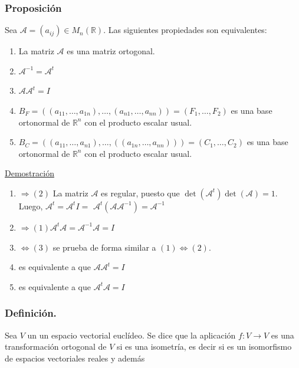 \documentclass[12pt, a4paper, ones, notitlepage, openany,titlepage]{article}
\begin{document}
\subsubsection{Proposición}
Sea $\mathcal{A}=\left(a_{i j}\right) \in M_{n}(\mathbb{R})$. Las siguientes propiedades son equivalentes:
\begin{enumerate}[label=(\arabic*)]
	\item La matriz $\mathcal{A}$ es una matriz ortogonal.
	\item $\mathcal{A}^{-1}=\mathcal{A}^{t}$
	\item $\mathcal{A} \mathcal{A}^{t}=I$
	\item $B_{F}=\left(\left(a_{11}, \ldots, a_{1 n}\right), \ldots,\left(a_{n 1}, \ldots, a_{n n}\right)\right) = \left(F_1,\ldots,F_2\right)$ es una base ortonormal de $\mathbb{R}^{n}$ con el producto escalar usual.
	\item $B_{C}=\left(\left(a_{11}, \ldots, a_{n 1}\right), \ldots,\left(\left(a_{1 n}, \ldots, a_{n n}\right)\right)\right) = \left(C_1,\ldots,C_2\right)$ es una base ortonormal de $\mathbb{R}^{n}$ con el producto escalar usual.
\end{enumerate}

\noindent\underline{Demostración}
\begin{enumerate}[label=(\arabic*)]
	\item $\Rightarrow(2)$ La matriz $\mathcal{A}$ es regular, puesto que $\operatorname{det}\left(\mathcal{A}^{t}\right) \operatorname{det}(\mathcal{A})=1$. Luego, $\mathcal{A}^{t}=\mathcal{A}^{t} I=$ $\mathcal{A}^{t}\left(\mathcal{A} \mathcal{A}^{-1}\right)=\mathcal{A}^{-1}$
	
	\item $\Rightarrow(1) \mathcal{A}^{t} \mathcal{A}=\mathcal{A}^{-1} \mathcal{A}=I$
	
	\item $\Leftrightarrow(3)$ se prueba de forma similar a $(1) \Leftrightarrow(2)$.
	
	\item es equivalente a que $\mathcal{A} \mathcal{A}^{t}=I$
	
	\item es equivalente a que $\mathcal{A}^{t} \mathcal{A}=I$ 
\end{enumerate}

\subsubsection{Definición.}
Sea $V$ un un espacio vectorial euclídeo. Se dice que la aplicación $f: V \rightarrow V$ es una transformación ortogonal de $V$ si es una isometría, es decir si es un isomorfismo de espacios vectoriales reales y además
\end{document}
